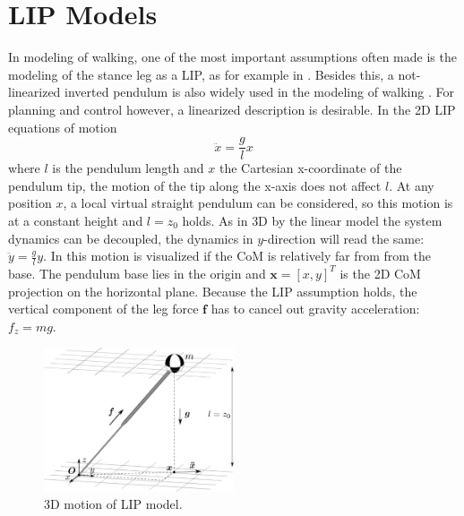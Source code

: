 \section{\ac{LIP} Models}
In modeling of walking, one of the most important assumptions often made is the modeling of the stance leg as a \ac{LIP}, as for example in \cite{kajita20013d}. Besides this, a not-linearized inverted pendulum is also widely used in the modeling of walking \cite{kuo2005energetic}. For planning and control however, a linearized description is desirable. In the \ac{2D} \ac{LIP} equations of motion
\begin{equation}
\ddot{x}=\frac{g}{l}x
\label{eq:LIPeom}
\end{equation}
where $l$ is the pendulum length and $x$ the Cartesian x-coordinate of the pendulum tip, the motion of the tip along the x-axis does not affect $l$. At any position $x$, a local virtual straight pendulum can be considered, so this motion is at a constant height and $l=z_0$  holds. As in \ac{3D} by the linear model the system dynamics can be decoupled, the dynamics in $y$-direction will read the same: $\ddot{y}=\frac{g}{l} y$. In  this motion is visualized if the \ac{CoM} is relatively far from from the base. The pendulum base lies in the origin and $\boldsymbol{x} = [x,y]^T$ is the \ac{2D} \ac{CoM} projection on the horizontal plane. Because the \ac{LIP} assumption holds, the vertical component of the leg force $\boldsymbol{f}$ has to cancel out gravity acceleration: $f_z=mg$.
\begin{figure}[h]
\centering
\includegraphics[width=0.5\textwidth]{STYLESTUFF/3DCoMwithoutfoot.png}
\caption{\ac{3D} motion of \ac{LIP} model.}
\label{fig:3dlip}
\end{figure}


